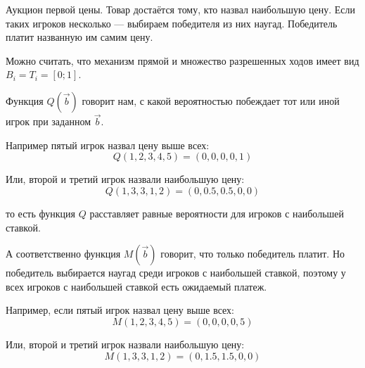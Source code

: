 \begin{myex} Аукцион первой цены. Товар достаётся тому, кто назвал наибольшую цену. Если таких игроков несколько — выбираем победителя из них наугад. Победитель платит названную им самим цену.

Можно считать, что механизм прямой и множество разрешенных ходов имеет вид $B_{i}=T_{i}=[0;1] $.

Функция $ Q(\vec{b}) $ говорит нам, с какой вероятностью побеждает тот или иной игрок при заданном $ \vec{b} $.

Например пятый игрок назвал цену выше всех:
\begin{equation}
Q(1,2,3,4,5)=(0,0,0,0,1)
\end{equation}

Или, второй и третий игрок назвали наибольшую цену:
\begin{equation}
Q(1,3,3,1,2)=(0,0.5,0.5,0,0)
\end{equation}

то есть функция $ Q $ расставляет равные вероятности для игроков с наибольшей ставкой.

А соответственно функция $ M(\vec{b}) $ говорит, что только победитель платит. Но победитель выбирается наугад среди игроков с наибольшей ставкой, поэтому у всех игроков с наибольшей ставкой есть ожидаемый платеж.

Например, если пятый игрок назвал цену выше всех:
\begin{equation}
M(1,2,3,4,5)=(0,0,0,0,5)
\end{equation}

Или, второй и третий игрок назвали наибольшую цену:
\begin{equation}
M(1,3,3,1,2)=(0,1.5,1.5,0,0)
\end{equation}






\end{myex}

